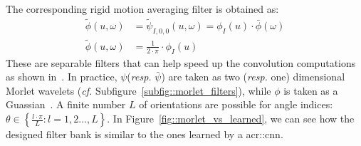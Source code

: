                     The corresponding rigid motion averaging filter is obtained as:
                    \begin{align}
                        \label{eq::roto-translation_low_pass}
                        \tilde{\phi}(u, \omega) &= \tilde{\psi}_{I, 0, 0}(u, \omega) = \phi_I(u) \cdot \bar\phi(\omega) \nonumber \\
                        \tilde{\phi}(u, \omega) &= \frac{1}{2\cdot\pi} \cdot \phi_I(u)
                    \end{align}
                    These are separable filters that can help speed up the convolution computations as shown in~\textcite{sifre2013rotation}.
                    In practice, $\psi$(\textit{resp.} $\bar\psi$) are taken as two (\textit{resp.} one) dimensional Morlet wavelets (\textit{cf.} Subfigure~\ref{subfig::morlet_filters}), while $\phi$ is taken as a Guassian~\parencite{sifre2013rotation,bruna2013invariant,oyallon2015deep}.
                    A finite number $L$ of orientations are possible for angle indices: $\theta \in \left\{\frac{l\cdot\pi}{L}: l=1,2\dots,L\right\}$.
                    In Figure~\ref{fig::morlet_vs_learned}, we can see how the designed filter bank is similar to the ones learned by a \gls{acr::cnn}.
